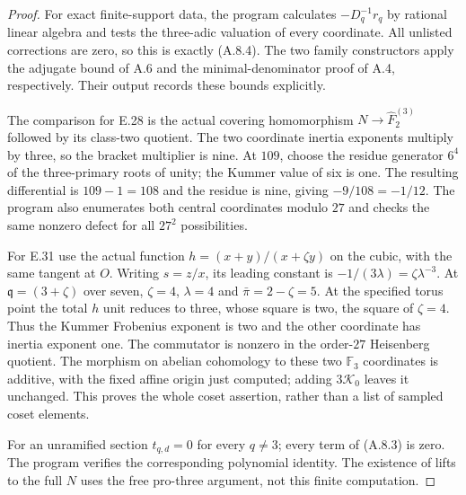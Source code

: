 \begin{proof}
For exact finite-support data, the program calculates $-D_q^{-1}r_q$
by rational linear algebra and tests the three-adic valuation of
every coordinate. All unlisted corrections are zero, so this is
exactly (A.8.4). The two family constructors apply the adjugate
bound of A.6 and the minimal-denominator proof of A.4, respectively.
Their output records these bounds explicitly.

The comparison for E.28 is the actual covering homomorphism
$N\to\widehat F_2^{(3)}$ followed by its class-two quotient.
The two coordinate inertia exponents multiply by three, so the
bracket multiplier is nine. At $109$, choose the residue generator
$6^4$ of the three-primary roots of unity; the Kummer value of six
is one. The resulting differential is $109-1=108$ and the residue
is nine, giving $-9/108=-1/12$. The program also enumerates both
central coordinates modulo $27$ and checks the same nonzero defect
for all $27^2$ possibilities.

For E.31 use the actual function
$h=(x+y)/(x+\zeta y)$ on the cubic, with the same tangent at $O$.
Writing $s=z/x$, its leading constant is
$-1/(3\lambda)=\zeta\lambda^{-3}$. At
$\mathfrak q=(3+\zeta)$ over seven, $\zeta=4$, $\lambda=4$ and
$\bar\pi=2-\zeta=5$. At the specified torus point the total
$h$ unit reduces to three, whose square is two, the square of
$\zeta=4$. Thus the Kummer Frobenius exponent is two and the
other coordinate has inertia exponent one. The commutator is
nonzero in the order-$27$ Heisenberg quotient. The morphism on
abelian cohomology to these two $\mathbb F_3$ coordinates is
additive, with the fixed affine origin just computed; adding
$3\mathcal K_0$ leaves it unchanged. This proves the whole coset
assertion, rather than a list of sampled coset elements.

For an unramified section $t_{q,d}=0$ for every $q\ne3$;
every term of (A.8.3) is zero. The program verifies the corresponding
polynomial identity. The existence of lifts to the full $N$ uses
the free pro-three argument, not this finite computation.


\end{proof}
